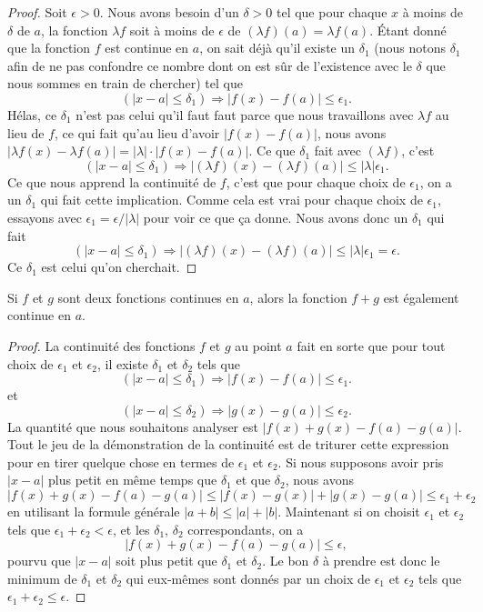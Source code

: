 \begin{proof}
Soit $\epsilon>0$. Nous avons besoin d'un $\delta>0$ tel que pour chaque $x$ à moins de $\delta$ de $a$, la fonction $\lambda f$ soit à moins de $\epsilon$ de $(\lambda f)(a)=\lambda f(a)$. Étant donné que la fonction $f$ est continue en $a$, on sait déjà qu'il existe un $\delta_1$ (nous notons $\delta_1$ afin de ne pas confondre ce nombre dont on est sûr de l'existence avec le $\delta$ que nous sommes en train de chercher) tel que 
\[ 
  (| x-a |\leq \delta_1)\Rightarrow | f(x)-f(a) |\leq \epsilon_1.
\]
Hélas, ce $\delta_1$ n'est pas celui qu'il faut faut parce que nous travaillons avec $\lambda f$ au lieu de $f$, ce qui fait qu'au lieu d'avoir $| f(x)-f(a) |$, nous avons $| \lambda f(x)-\lambda f(a) |=| \lambda |\cdot | f(x)-f(a) |$.  Ce que $\delta_1$ fait avec $(\lambda f)$, c'est
\[ 
  (| x-a |\leq\delta_1)\Rightarrow  | (\lambda f)(x)- (\lambda f)(a)|\leq | \lambda |\epsilon_1.
\]
Ce que nous apprend la continuité de $f$, c'est que pour chaque choix de $\epsilon_1$, on a un $\delta_1$ qui fait cette implication. Comme cela est vrai pour chaque choix de $\epsilon_1$, essayons avec $\epsilon_1=\epsilon/| \lambda |$ pour voir ce que ça donne. Nous avons donc un $\delta_1$ qui fait
\[ 
  (| x-a |\leq\delta_1)\Rightarrow  | (\lambda f)(x)- (\lambda f)(a)|\leq | \lambda |\epsilon_1=\epsilon.
\]
Ce $\delta_1$ est celui qu'on cherchait. 
\end{proof}

\begin{theorem}
Si $f$ et $g$ sont deux fonctions continues en $a$, alors la fonction $f+g$ est également continue en $a$.
\end{theorem}

\begin{proof}
La continuité des fonctions $f$ et $g$ au point $a$ fait en sorte que pour tout choix de $\epsilon_1$ et $\epsilon_2$, il existe $\delta_1$ et $\delta_2$ tels que 
\[ 
  (| x-a |\leq \delta_1)\Rightarrow | f(x)-f(a) |\leq \epsilon_1.
\]
et
\[ 
  (| x-a |\leq \delta_2)\Rightarrow | g(x)-g(a) |\leq \epsilon_2.
\]
La quantité que nous souhaitons analyser est $| f(x)+g(x)-f(a)-g(a) |$. Tout le jeu de la démonstration de la continuité est de triturer cette expression pour en tirer quelque chose en termes de $\epsilon_1$ et $\epsilon_2$. Si nous supposons avoir pris $| x-a |$ plus petit en même temps que $\delta_1$ et que $\delta_2$, nous avons
\[
| f(x)+g(x)-f(a)-g(a) |\leq| f(x)-g(x) |+| g(x)-g(a) |\leq\epsilon_1+\epsilon_2 
\]
en utilisant la formule générale $| a+b |\leq | a |+| b |$. Maintenant si on choisit $\epsilon_1$ et $\epsilon_2$ tels que $\epsilon_1+\epsilon_2<\epsilon$, et les $\delta_1$, $\delta_2$ correspondants, on a
\[
| f(x)+g(x)-f(a)-g(a) |\leq\epsilon,
\]
pourvu que $| x-a |$ soit plus petit que $\delta_1$ et $\delta_2$. Le bon $\delta$ à prendre est donc le minimum de $\delta_1$ et $\delta_2$ qui eux-mêmes sont donnés par un choix de $\epsilon_1$ et $\epsilon_2$ tels que $\epsilon_1+\epsilon_2\leq\epsilon$.
\end{proof}

